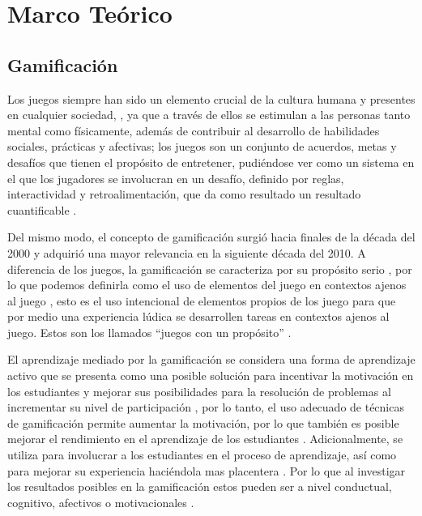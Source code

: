 %

\section{Marco Teórico}

\subsection{Gamificación}

Los juegos siempre han sido un elemento crucial de la cultura humana y presentes en cualquier sociedad,
\cite{KRATH2021106963}, ya que a través de ellos se estimulan a las personas tanto mental como físicamente, 
además de contribuir al desarrollo de habilidades sociales, prácticas y afectivas; los juegos son un conjunto
de acuerdos, metas y desafíos que tienen el propósito de entretener, pudiéndose ver como un sistema en el que
los jugadores se involucran en un desafío, definido por reglas, interactividad y retroalimentación, que da 
como resultado un resultado cuantificable \cite{baldeon2015}.

Del mismo modo, el concepto de gamificación surgió hacia finales de la década del 2000 y adquirió una mayor 
relevancia en la siguiente década del 2010. A diferencia de los juegos, la gamificación se caracteriza por su 
propósito serio \cite{KRATH2021106963}, por lo que podemos definirla como el uso de elementos del juego en 
contextos ajenos al juego \cite{KRATH2021106963}, esto es el uso intencional de elementos propios de los juego 
para que por medio una experiencia lúdica se desarrollen tareas en contextos ajenos al juego. Estos son los 
llamados ``juegos con un propósito'' \cite{PRESTOPNIK2015492}.

El aprendizaje mediado por la gamificación se considera una forma de aprendizaje activo que se presenta como 
una posible solución para incentivar la motivación en los estudiantes y mejorar sus posibilidades para la 
resolución de problemas al incrementar su nivel de participación \cite{PUTZ2020106392}, por lo tanto, el uso
adecuado de técnicas de gamificación permite aumentar la motivación, por lo que también es posible mejorar el 
rendimiento en el aprendizaje de los estudiantes \cite{KUSUMA2021886}. Adicionalmente, se utiliza para 
involucrar a los estudiantes en el proceso de aprendizaje, así como para mejorar su experiencia haciéndola 
mas placentera \cite{SBIE8805}. Por lo que al investigar los resultados posibles en la gamificación estos 
pueden ser a nivel conductual, cognitivo, afectivos o motivacionales \cite{KRATH2021106963}.

